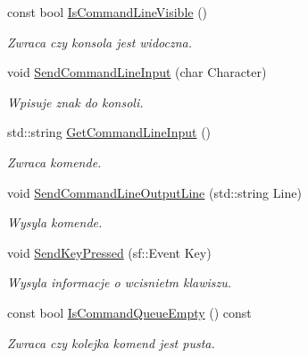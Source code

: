 \begin{DoxyCompactItemize}
const bool \mbox{\hyperlink{classtfp_1_1_interface_aabf92504d2950f393a16e8adeb4919b7}{Is\+Command\+Line\+Visible}} ()
\begin{DoxyCompactList}\small\item\em Zwraca czy konsola jest widoczna. \end{DoxyCompactList}\item 
void \mbox{\hyperlink{classtfp_1_1_interface_a9d663b1162c4b165491a66cf8c55edc9}{Send\+Command\+Line\+Input}} (char Character)
\begin{DoxyCompactList}\small\item\em Wpisuje znak do konsoli. \end{DoxyCompactList}\item 
\mbox{\label{classtfp_1_1_interface_adf80acbffab3298d3c01c0552d4cb31f}} 
std\+::string \mbox{\hyperlink{classtfp_1_1_interface_adf80acbffab3298d3c01c0552d4cb31f}{Get\+Command\+Line\+Input}} ()
\begin{DoxyCompactList}\small\item\em Zwraca komende. \end{DoxyCompactList}\item 
\mbox{\label{classtfp_1_1_interface_acf9033a390a4173970cc5fcf60a13c5f}} 
void \mbox{\hyperlink{classtfp_1_1_interface_acf9033a390a4173970cc5fcf60a13c5f}{Send\+Command\+Line\+Output\+Line}} (std\+::string Line)
\begin{DoxyCompactList}\small\item\em Wysyla komende. \end{DoxyCompactList}\item 
\mbox{\label{classtfp_1_1_interface_aa3aa2aafa7c3a126183eeb9055a088c9}} 
void \mbox{\hyperlink{classtfp_1_1_interface_aa3aa2aafa7c3a126183eeb9055a088c9}{Send\+Key\+Pressed}} (sf\+::\+Event Key)
\begin{DoxyCompactList}\small\item\em Wysyla informacje o wcisnietm klawiszu. \end{DoxyCompactList}\item 
\mbox{\label{classtfp_1_1_interface_a52ff75098c2c18a2f11f10f9d943aabf}} 
const bool \mbox{\hyperlink{classtfp_1_1_interface_a52ff75098c2c18a2f11f10f9d943aabf}{Is\+Command\+Queue\+Empty}} () const
\begin{DoxyCompactList}\small\item\em Zwraca czy kolejka komend jest pusta. \end{DoxyCompactList}\item 

\end{DoxyCompactItemize}
